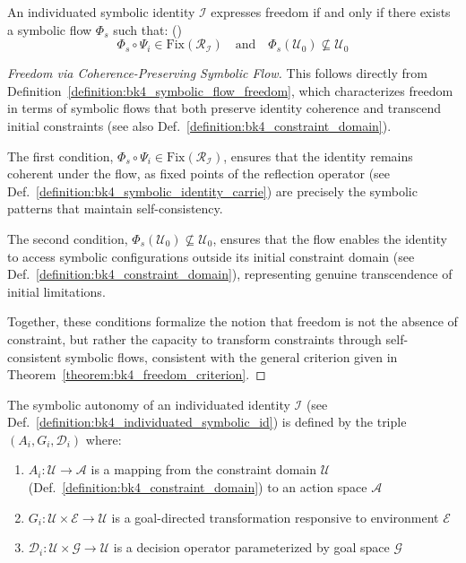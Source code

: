 \begin{theorem} \label{theorem:bk4_freedom_criterion}
An individuated symbolic identity $\mathcal{I}$ expresses freedom if and only if there exists a symbolic flow $\Phi_s$ such that: ()
\begin{equation}
    \Phi_s \circ \Psi_i \in \text{Fix}(\mathcal{R}_{\mathcal{I}}) \quad \text{and} \quad \Phi_s(\mathcal{U}_0) \not\subseteq \mathcal{U}_0
\end{equation}
\end{theorem}
\begin{proof}[Freedom via Coherence-Preserving Symbolic Flow]
\label{proof:bk4_freedom_via_symbolic_flow}
This follows directly from Definition~\ref{definition:bk4_symbolic_flow_freedom}, which characterizes freedom in terms of symbolic flows that both preserve identity coherence and transcend initial constraints (see also Def.~\ref{definition:bk4_constraint_domain}).

The first condition, $\Phi_s \circ \Psi_i \in \text{Fix}(\mathcal{R}_{\mathcal{I}})$, ensures that the identity remains coherent under the flow, as fixed points of the reflection operator (see Def.~\ref{definition:bk4_symbolic_identity_carrie}) are precisely the symbolic patterns that maintain self-consistency.

The second condition, $\Phi_s(\mathcal{U}_0) \not\subseteq \mathcal{U}_0$, ensures that the flow enables the identity to access symbolic configurations outside its initial constraint domain (see Def.~\ref{definition:bk4_constraint_domain}), representing genuine transcendence of initial limitations.

Together, these conditions formalize the notion that freedom is not the absence of constraint, but rather the capacity to transform constraints through self-consistent symbolic flows, consistent with the general criterion given in Theorem~\ref{theorem:bk4_freedom_criterion}.
\end{proof}

\begin{definition}
\label{definition:bk4_symbolic_autonomy}
The symbolic autonomy of an individuated identity $\mathcal{I}$ (see Def.~\ref{definition:bk4_individuated_symbolic_id}) is defined by the triple $(A_i, G_i, \mathcal{D}_i)$ where:
\begin{enumerate}
    \item $A_i: \mathcal{U} \to \mathcal{A}$ is a mapping from the constraint domain $\mathcal{U}$ (Def.~\ref{definition:bk4_constraint_domain}) to an action space $\mathcal{A}$
    \item $G_i: \mathcal{U} \times \mathcal{E} \to \mathcal{U}$ is a goal-directed transformation responsive to environment $\mathcal{E}$
    \item $\mathcal{D}_i: \mathcal{U} \times \mathcal{G} \to \mathcal{U}$ is a decision operator parameterized by goal space $\mathcal{G}$
\end{enumerate}
\end{definition}

